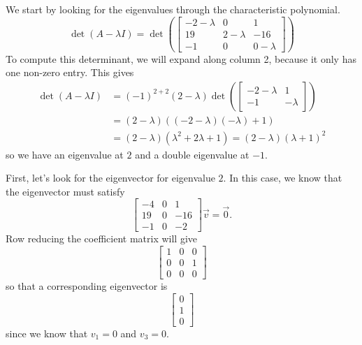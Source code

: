 \documentclass{ximera}
\begin{document}
\begin{exampleSol}
    We start by looking for the eigenvalues through the characteristic polynomial.
    \[ 
        \det(A - \lambda I) = \det
        \left( 
            \begin{bmatrix} 
                -2-\lambda & 0 & 1 \\ 
                19 & 2-\lambda & -16 \\ 
                -1 & 0 & 0-\lambda 
            \end{bmatrix}
        \right) 
    \] 
    To compute this determinant, we will expand along column 2, because it only has one non-zero entry. This gives
    \[ 
        \begin{split}
            \det(A - \lambda I) &= (-1)^{2+2} (2-\lambda)\det
            \left( 
                \begin{bmatrix} 
                    -2-\lambda & 1 \\ 
                    -1 & -\lambda 
                \end{bmatrix}
            \right) \\
            &= (2-\lambda)((-2-\lambda)(-\lambda) + 1) \\
            &= (2-\lambda)(\lambda^2 + 2\lambda + 1) = (2-\lambda)(\lambda+1)^2
        \end{split}
    \] 
    so we have an eigenvalue at $2$ and a double eigenvalue at $-1$. 
    
    First, let's look for the eigenvector for eigenvalue $2$. In this case, we know that the eigenvector must satisfy
    \[ 
        \begin{bmatrix} 
            -4 & 0 & 1 \\ 
            19 & 0 & -16 \\ 
            -1 & 0 & -2 
        \end{bmatrix} 
        \vec{v} = \vec{0}. 
    \] 
    Row reducing the coefficient matrix will give
    \[ 
        \begin{bmatrix} 
            1 & 0 & 0 \\ 
            0 & 0 & 1 \\ 
            0 & 0 & 0 
        \end{bmatrix} 
    \] 
    so that a corresponding eigenvector is 
    \[ 
        \begin{bmatrix} 
            0 \\ 
            1 \\ 
            0 
        \end{bmatrix} 
    \] 
    since we know that $v_1 = 0$ and $v_3 = 0$. 
    

\end{exampleSol}
\end{document}
